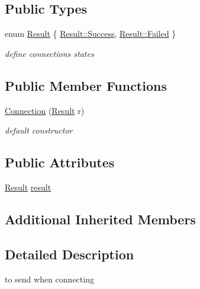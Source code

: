 \subsection*{Public Types}
\begin{DoxyCompactItemize}
\item 
enum \hyperlink{class_network_1_1_messages_1_1_connection_a592ae6d90a06c7799df087658848ada6}{Result} \{ \hyperlink{class_network_1_1_messages_1_1_connection_a592ae6d90a06c7799df087658848ada6a505a83f220c02df2f85c3810cd9ceb38}{Result\+::\+Success}, 
\hyperlink{class_network_1_1_messages_1_1_connection_a592ae6d90a06c7799df087658848ada6ad7c8c85bf79bbe1b7188497c32c3b0ca}{Result\+::\+Failed}
 \}\begin{DoxyCompactList}\small\item\em define connection\textquotesingle{}s states \end{DoxyCompactList}
\end{DoxyCompactItemize}
\subsection*{Public Member Functions}
\begin{DoxyCompactItemize}
\item 
\hyperlink{class_network_1_1_messages_1_1_connection_a98074843fa7d7dee6baeb3863a421872}{Connection} (\hyperlink{class_network_1_1_messages_1_1_connection_a592ae6d90a06c7799df087658848ada6}{Result} r)
\begin{DoxyCompactList}\small\item\em default constructor \end{DoxyCompactList}\end{DoxyCompactItemize}
\subsection*{Public Attributes}
\begin{DoxyCompactItemize}
\item 
\hyperlink{class_network_1_1_messages_1_1_connection_a592ae6d90a06c7799df087658848ada6}{Result} \hyperlink{class_network_1_1_messages_1_1_connection_a5ee62fd0bb656b93ef08f22afdc5a47e}{result}
\end{DoxyCompactItemize}
\subsection*{Additional Inherited Members}


\subsection{Detailed Description}
to send when connecting 

